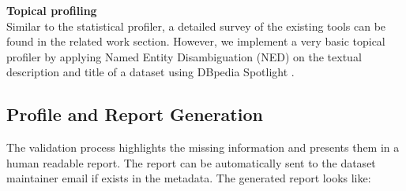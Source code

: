 \documentclass[runningheads,a4paper]{llncs}
\begin{document}
\textbf{Topical profiling}\\

Similar to the statistical profiler, a detailed survey of the existing tools can be found in the related work section. However, we implement a very basic topical profiler by applying Named Entity Disambiguation (NED) on the textual description and title of a dataset using DBpedia Spotlight \cite{Mendes:2011:DSS:2063518.2063519}.

\subsection{Profile and Report Generation}

The validation process highlights the missing information and presents them in a human readable report. The report can be automatically sent to the dataset maintainer email if exists in the metadata. The generated report looks like:
\end{document}
